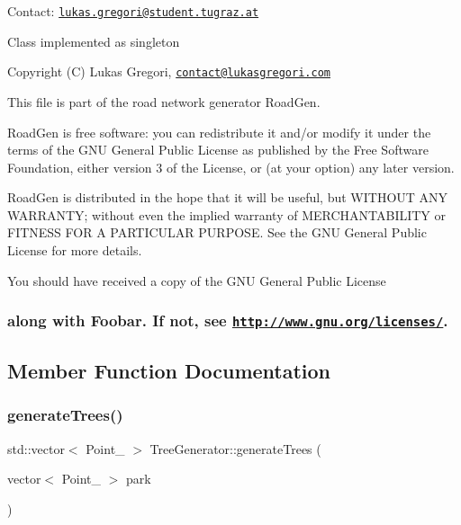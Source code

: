 Contact\+: \href{mailto:lukas.gregori@student.tugraz.at}{\tt lukas.\+gregori@student.\+tugraz.\+at}

Class implemented as singleton



 Copyright (C) Lukas Gregori, \href{mailto:contact@lukasgregori.com}{\tt contact@lukasgregori.\+com}

This file is part of the road network generator Road\+Gen.

Road\+Gen is free software\+: you can redistribute it and/or modify it under the terms of the G\+NU General Public License as published by the Free Software Foundation, either version 3 of the License, or (at your option) any later version.

Road\+Gen is distributed in the hope that it will be useful, but W\+I\+T\+H\+O\+UT A\+NY W\+A\+R\+R\+A\+N\+TY; without even the implied warranty of M\+E\+R\+C\+H\+A\+N\+T\+A\+B\+I\+L\+I\+TY or F\+I\+T\+N\+E\+SS F\+OR A P\+A\+R\+T\+I\+C\+U\+L\+AR P\+U\+R\+P\+O\+SE. See the G\+NU General Public License for more details.

You should have received a copy of the G\+NU General Public License \subsubsection*{along with Foobar. If not, see \href{http://www.gnu.org/licenses/}{\tt http\+://www.\+gnu.\+org/licenses/}. }

\subsection{Member Function Documentation}
\hypertarget{class_tree_generator_af5688087b3d43a0abd62716e8ae8fa18}{}\label{class_tree_generator_af5688087b3d43a0abd62716e8ae8fa18} 
\subsubsection{\texorpdfstring{generate\+Trees()}{generateTrees()}}
{\footnotesize\ttfamily std\+::vector$<$ Point\+\_ $>$ Tree\+Generator\+::generate\+Trees (\begin{DoxyParamCaption}\item[{vector$<$ Point\+\_\+2 $>$}]{park }\end{DoxyParamCaption})\hspace{0.3cm}{\ttfamily [static]}}



